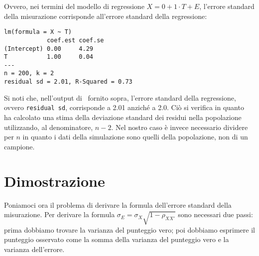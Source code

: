 Ovvero, nei termini del modello di regressione $X = 0 + 1 \cdot T + E$, l'errore standard della misurazione corrisponde all'errore standard della regressione:
\begin{lstlisting} 
lm(formula = X ~ T)
            coef.est coef.se
(Intercept) 0.00     4.29   
T           1.00     0.04   
---
n = 200, k = 2
residual sd = 2.01, R-Squared = 0.73
\end{lstlisting} 
Si noti che, nell'output di \R\, fornito sopra, l'errore standard della regressione, ovvero \texttt{residual sd}, corrisponde a 2.01 anziché a 2.0. Ciò si verifica in quanto \R\, ha calcolato una stima della deviazione standard dei residui nella popolazione utilizzando, al denominatore, $n - 2$. Nel nostro caso è invece necessario dividere per $n$ in quanto i dati della simulazione sono quelli della popolazione, non di un campione.



\section{Dimostrazione}

Poniamoci ora il problema di derivare la formula dell'errore standard della misurazione.
Per derivare la formula 
$
\sigma_E = \sigma_X \sqrt{1 -\rho_{XX'}}
$
sono necessari due passi: prima dobbiamo trovare la varianza del punteggio vero; poi dobbiamo esprimere il punteggio osservato come la somma della varianza del punteggio vero e la varianza dell'errore.

